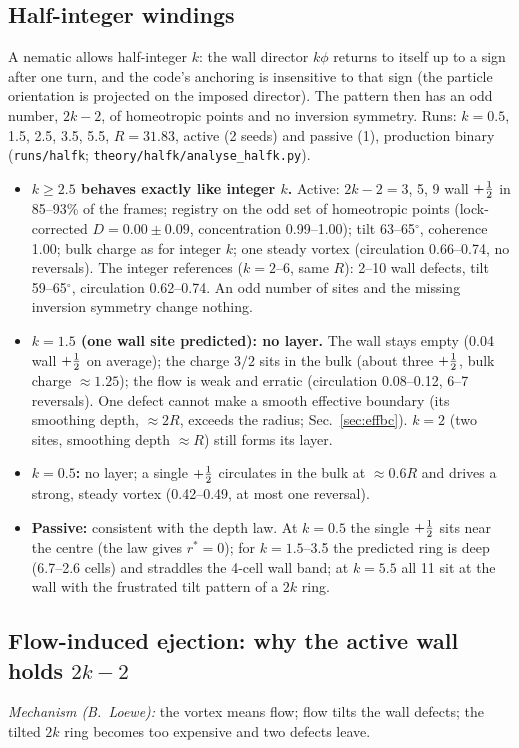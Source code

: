 \subsection{Half-integer windings}\label{sec:halfk}
A nematic allows half-integer $k$: the wall director $k\phi$ returns to itself up to a sign after one turn, and the code's anchoring is insensitive to that sign
(the particle orientation is projected on the imposed director). The pattern then has an odd number, $2k-2$, of homeotropic points and no inversion symmetry.
Runs: $k=0.5$, 1.5, 2.5, 3.5, 5.5, $R=31.83$, active (2 seeds) and passive (1), production binary (\texttt{runs/halfk}; \texttt{theory/halfk/analyse\_halfk.py}).
\begin{itemize}
  \item \textbf{$k\ge2.5$ behaves exactly like integer $k$.} Active: $2k-2=3$, 5, 9 wall $+\tfrac12$ in 85--93\% of the frames; registry on the odd set of homeotropic
        points (lock-corrected $D=0.00\pm0.09$, concentration 0.99--1.00); tilt 63--65$^\circ$, coherence 1.00; bulk charge as for integer $k$; one steady vortex
        (circulation 0.66--0.74, no reversals). The integer references ($k=2$--6, same $R$): 2--10 wall defects, tilt 59--65$^\circ$, circulation 0.62--0.74. An odd
        number of sites and the missing inversion symmetry change nothing.
  \item \textbf{$k=1.5$ (one wall site predicted): no layer.} The wall stays empty (0.04 wall $+\tfrac12$ on average); the charge $3/2$ sits in the bulk (about three $+\tfrac12$,
        bulk charge $\approx1.25$); the flow is weak and erratic (circulation 0.08--0.12, 6--7 reversals). One defect cannot make a smooth effective boundary (its smoothing
        depth, $\approx2R$, exceeds the radius; Sec.~\ref{sec:effbc}). $k=2$ (two sites, smoothing depth $\approx R$) still forms its layer.
  \item \textbf{$k=0.5$:} no layer; a single $+\tfrac12$ circulates in the bulk at $\approx0.6R$ and drives a strong, steady vortex (0.42--0.49, at most one reversal).
  \item \textbf{Passive:} consistent with the depth law. At $k=0.5$ the single $+\tfrac12$ sits near the centre (the law gives $r^*=0$); for $k=1.5$--3.5 the predicted ring is
        deep (6.7--2.6 cells) and straddles the 4-cell wall band; at $k=5.5$ all 11 sit at the wall with the frustrated tilt pattern of a $2k$ ring.
\end{itemize}

\subsection{Flow-induced ejection: why the active wall holds $2k-2$}\label{sec:ejection}
\emph{Mechanism (B.~Loewe):} the vortex means flow; flow tilts the wall defects; the tilted $2k$ ring becomes too expensive and two defects leave.
